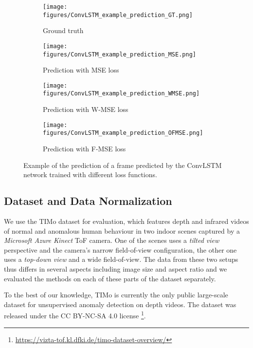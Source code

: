 \documentclass[10pt,twocolumn,letterpaper]{article}
\begin{document}
\begin{figure*}[tb]
  \centering
  \begin{subfigure}{0.245\linewidth}
    \texttt{[image: figures/ConvLSTM\_example\_prediction\_GT.png]}
    \caption{Ground truth}
    \label{fig:example_prediction_GT}
  \end{subfigure}
  \begin{subfigure}{0.245\linewidth}
    \texttt{[image: figures/ConvLSTM\_example\_prediction\_MSE.png]}
    \caption{Prediction with MSE loss}
    \label{fig:example_prediction_MSE}
  \end{subfigure}
    \begin{subfigure}{0.245\linewidth}
    \texttt{[image: figures/ConvLSTM\_example\_prediction\_WMSE.png]}
    \caption{Prediction with W-MSE loss}
    \label{fig:example_prediction_WMSE}
  \end{subfigure}
    \begin{subfigure}{0.245\linewidth}
    \texttt{[image: figures/ConvLSTM\_example\_prediction\_OFMSE.png]}
    \caption{Prediction with F-MSE loss}
    \label{fig:example_prediction_OFMSE}
  \end{subfigure}
  \caption{Example of the prediction of a frame predicted by the ConvLSTM network trained with different loss functions.}
  \label{fig:example_predictions}
\end{figure*}

\subsection{Dataset and Data Normalization} \label{sec:dataset}
We use the TIMo dataset \cite{schneider2021timo} for evaluation, which features depth and infrared videos of normal and anomalous human behaviour in two indoor scenes captured by a \emph{Microsoft Azure Kinect} ToF camera. One of the scenes uses a \emph{tilted view} perspective and the camera's narrow field-of-view configuration, the other one uses a \emph{top-down view} and a wide field-of-view. The data from these two setups thus differs in several aspects including image size and aspect ratio and we evaluated the methods on each of these parts of the dataset separately.

To the best of our knowledge, TIMo is currently the only public large-scale dataset for unsupervised anomaly detection on depth videos. The dataset was released under the CC BY-NC-SA 4.0 license \footnote{\url{https://vizta-tof.kl.dfki.de/timo-dataset-overview/}}.
\end{document}
